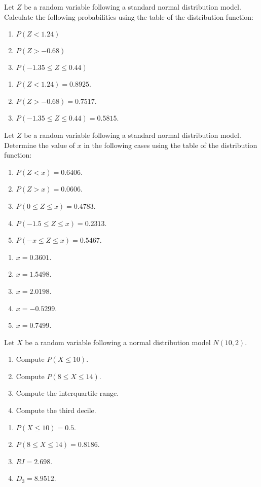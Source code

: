 {Let $Z$ be a random variable following a standard normal distribution model.
Calculate the following probabilities using the table of the distribution function:
\begin{enumerate}
\item $P(Z<1.24)$
\item $P(Z>-0.68)$
\item $P(-1.35\leq Z\leq 0.44)$
\end{enumerate}
}
{
\begin{enumerate}
\item $P(Z<1.24)=0.8925$.
\item $P(Z>-0.68)=0.7517$.
\item $P(-1.35\leq Z\leq 0.44)=0.5815$.
\end{enumerate}
}
{}


{Let $Z$ be a random variable following a standard normal distribution model.
Determine the value of $x$ in the following cases using the table of the distribution function:
\begin{enumerate}
\item $P(Z<x)=0.6406$.
\item $P(Z>x)=0.0606$.
\item $P(0\leq Z\leq x)=0.4783$.
\item $P(-1.5\leq Z\leq x)=0.2313$.
\item $P(-x\leq Z\leq x)=0.5467$.
\end{enumerate}
}
{
\begin{enumerate}
\item $x=0.3601$. 
\item $x=1.5498$. 
\item $x=2.0198$.
\item $x=−0.5299$. 
\item $x=0.7499$.
\end{enumerate}
}
{}


{Let $X$ be a random variable following a normal distribution model $N(10,2)$.
\begin{enumerate}
\item Compute $P(X\leq 10)$.
\item Compute $P(8\leq X\leq 14)$.
\item Compute the interquartile range. 
\item Compute the third decile. 
\end{enumerate}
}
{
\begin{enumerate}
\item $P(X\leq 10)=0.5$.
\item $P(8\leq X\leq 14)=0.8186$. 
\item $RI=2.698$.
\item $D_3=8.9512$.
\end{enumerate}
}
{
}


